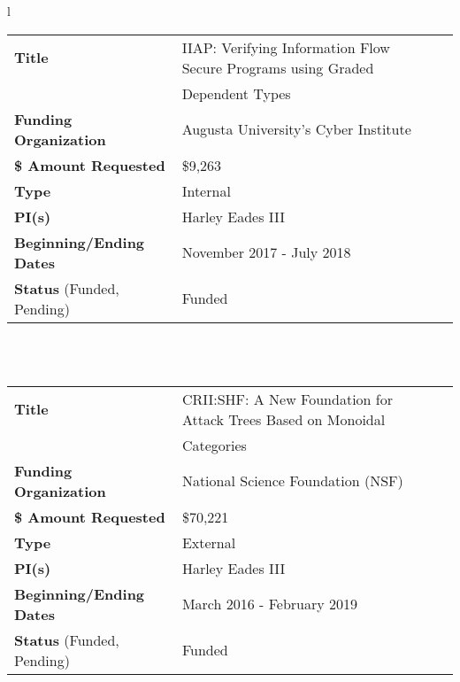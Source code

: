\documentclass[11pt]{article}
\begin{document}
\begin{center}
\begin{tabular}{l}
        \begin{tabular}{|l|l|l|}
          \hline
          \textbf{Title} & IIAP: Verifying Information Flow Secure Programs using Graded\,\,\,\,\,\, \\
          & Dependent Types\\
          \hline
          \textbf{Funding Organization} & Augusta University's Cyber Institute\\
          \hline
          \textbf{\$ Amount Requested} & \$9,263\\
          \hline
          \textbf{Type} & Internal\\
          \hline
          \textbf{PI(s)} & Harley Eades III\\
          \hline
          \textbf{Beginning/Ending Dates} & November 2017 - July 2018\\
          \hline
          \textbf{Status} (Funded, Pending) & Funded\\
          \hline
        \end{tabular}\\
        \\
        \begin{tabular}{|l|l|l|}
          \hline
          \textbf{Title} & CRII:SHF: A New Foundation for Attack Trees Based on Monoidal \\
                         & Categories\\
          \hline
          \textbf{Funding Organization} & National Science Foundation (NSF)\\
          \hline
          \textbf{\$ Amount Requested} & \$70,221\\
          \hline
          \textbf{Type} & External\\
          \hline
          \textbf{PI(s)} & Harley Eades III\\
          \hline
          \textbf{Beginning/Ending Dates} & March 2016 - February 2019\\
          \hline
          \textbf{Status} (Funded, Pending) & Funded\\
          \hline
        \end{tabular}
      \end{tabular}
    \end{center}        
\end{document}
